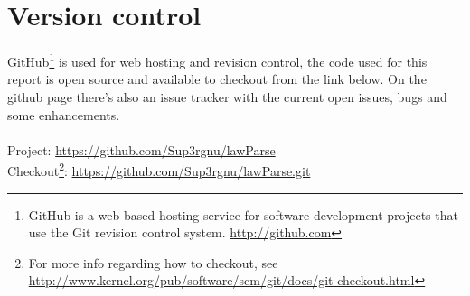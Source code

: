 \section{Version control}

GitHub\footnote{GitHub is a web-based hosting service for software development
projects that use the Git revision control system. \url{http://github.com}} is
used for web hosting and revision control, the code used for this report is
open source and available to checkout from the link below. On the github page
there's also an issue tracker with the current open issues, bugs and some
enhancements.\\\\
Project: \url{https://github.com/Sup3rgnu/lawParse}\\
Checkout\footnote{For more info regarding how to checkout, see \url{http://www.kernel.org/pub/software/scm/git/docs/git-checkout.html}}: \url{https://github.com/Sup3rgnu/lawParse.git}

